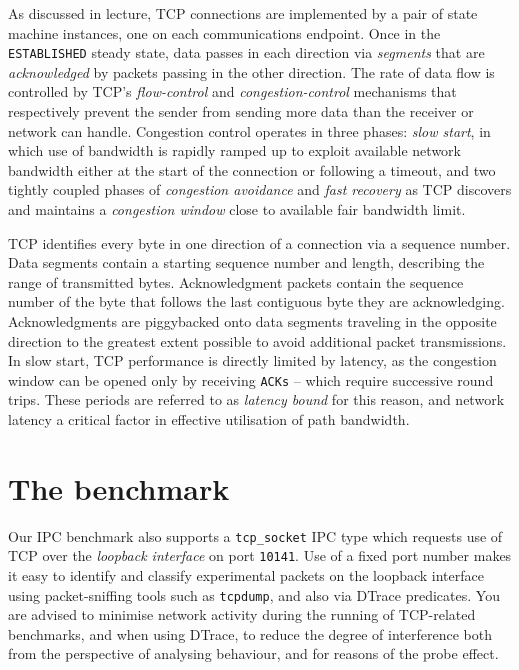 \documentclass[a4paper,10pt]{article}
\begin{document}
As discussed in lecture, TCP connections are implemented by a pair of state
machine instances, one on each communications endpoint.
Once in the \texttt{ESTABLISHED} steady state, data passes in each direction
via \textit{segments} that are \textit{acknowledged} by packets passing in the
other direction.
The rate of data flow is controlled by TCP's \textit{flow-control} and
\textit{congestion-control} mechanisms that respectively prevent the sender
from sending more data than the receiver or network can handle.
Congestion control operates in three phases: \textit{slow start}, in which use
of bandwidth is rapidly ramped up to exploit available network bandwidth
either at the start of the connection or following a timeout, and two tightly
coupled phases of \textit{congestion avoidance} and \textit{fast recovery} as
TCP discovers and maintains a \textit{congestion window} close to available
fair bandwidth limit.

TCP identifies every byte in one direction of a connection via a sequence
number.
Data segments contain a starting sequence number and length, describing the
range of transmitted bytes.
Acknowledgment packets contain the sequence number of the byte that follows
the last contiguous byte they are acknowledging.
Acknowledgments are piggybacked onto data segments traveling in the opposite
direction to the greatest extent possible to avoid additional packet
transmissions.
In slow start, TCP performance is directly limited by latency, as the
congestion window can be opened only by receiving \texttt{ACKs} -- which
require successive round trips.
These periods are referred to as \textit{latency bound} for this reason, and
network latency a critical factor in effective utilisation of path bandwidth.

\section*{The benchmark}

Our IPC benchmark also supports a \texttt{tcp\_socket} IPC
type which requests use of TCP over the \textit{loopback interface} on port
\texttt{10141}.
Use of a fixed port number makes it easy to identify and classify experimental
packets on the loopback interface using packet-sniffing tools such as
\texttt{tcpdump}, and also via DTrace predicates.
You are advised to minimise network activity during the running of TCP-related
benchmarks, and when using DTrace, to reduce the degree of interference both
from the perspective of analysing behaviour, and for reasons of the probe
effect.
\end{document}
